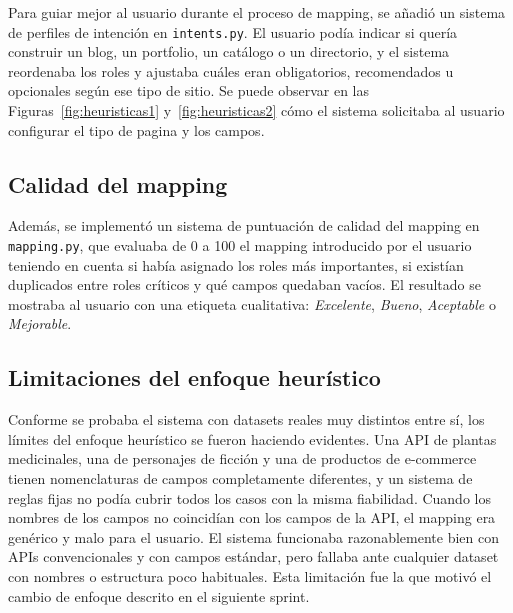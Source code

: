 Para guiar mejor al usuario durante el proceso de mapping, se añadió un sistema de perfiles de intención en \texttt{intents.py}. El usuario podía indicar si quería construir un blog, un portfolio, un catálogo o un directorio, y el sistema reordenaba los roles y ajustaba cuáles eran obligatorios, recomendados u opcionales según ese tipo de sitio.
Se puede observar en las Figuras~\ref{fig:heuristicas1} y~\ref{fig:heuristicas2} 
cómo el sistema solicitaba al usuario configurar el tipo de pagina y los campos.

\subsection{Calidad del mapping}
\label{subsec:calidad-mapping}
Además, se implementó un sistema de puntuación de calidad del mapping en \texttt{mapping.py}, que evaluaba de 0 a 100 el mapping introducido por el usuario teniendo en cuenta si había asignado los roles más importantes, si existían duplicados entre roles críticos y qué campos quedaban vacíos. El resultado se mostraba al usuario con una etiqueta cualitativa: \emph{Excelente}, \emph{Bueno}, \emph{Aceptable} o \emph{Mejorable}.


%

\subsection{Limitaciones del enfoque heurístico} 
\label{subsec:limitaciones1}

Conforme se probaba el sistema con datasets reales muy distintos entre sí, los límites del enfoque heurístico se fueron haciendo evidentes. Una API de plantas medicinales, una de personajes de ficción y una de productos de e-commerce tienen nomenclaturas de campos completamente diferentes, y un sistema de reglas fijas no podía cubrir todos los casos con la misma fiabilidad. Cuando los nombres de los campos no coincidían con los campos de la API, el mapping era genérico y malo para el usuario. El sistema funcionaba razonablemente bien con APIs convencionales y con campos estándar, pero fallaba ante cualquier dataset con nombres o estructura poco habituales. Esta limitación fue la que motivó el cambio de enfoque descrito en el siguiente sprint.


